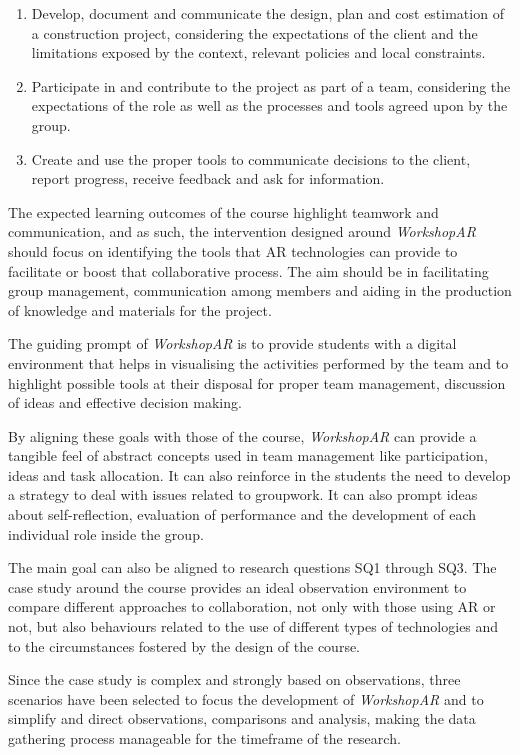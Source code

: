 \begin{enumerate}
    \item Develop, document and communicate the design, plan and cost estimation of a construction project, considering the expectations of the client and the limitations
    exposed by the context, relevant policies and local constraints.
    \item Participate in and contribute to the project as part of a team, considering the expectations of the role as well as the processes and tools agreed upon by the
    group.
    \item Create and use the proper tools to communicate decisions to the client, report progress, receive feedback and ask for information.
\end{enumerate}

The expected learning outcomes of the course highlight teamwork and communication, and as such, the intervention designed around \emph{WorkshopAR} should
focus on identifying the tools that \ac{AR} technologies can provide to facilitate or boost that collaborative process. The aim should be in facilitating group management,
communication among members and aiding in the production of knowledge and materials for the project.

The guiding prompt of \emph{WorkshopAR} is to provide students with a digital environment that helps in visualising the activities performed by the team and to highlight
possible tools at their disposal for proper team management, discussion of ideas and effective decision making.

By aligning these goals with those of the course, \emph{WorkshopAR} can provide a tangible feel of abstract concepts used in team management like participation, ideas and task
allocation. It can also reinforce in the students the need to develop a strategy to deal with issues related to groupwork. It can also prompt ideas about self-reflection,
evaluation of performance and the development of each individual role inside the group.

The main goal can also be aligned to research questions SQ1 through SQ3. The case study around the course provides an ideal observation environment to compare different
approaches to collaboration, not only with those using \ac{AR} or not, but also behaviours related to the use of different types of technologies and to the circumstances
fostered by the design of the course.

Since the case study is complex and strongly based on observations, three scenarios have been selected to focus the development of \emph{WorkshopAR} and to simplify and direct
observations, comparisons and analysis, making the data gathering process manageable for the timeframe of the research.

